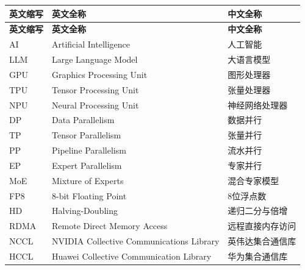 \cleardoublepage
{}
\begin{center}
    \begin{longtable}{m{2cm}m{8cm}m{5cm}}
        \toprule
        \textbf{英文缩写}&\textbf{英文全称}&\textbf{中文全称}\\
        \midrule
        \endfirsthead
        \toprule
        \textbf{英文缩写}&\textbf{英文全称}&\textbf{中文全称}\\
        \midrule
        \endhead 
        \bottomrule
        \endfoot
        \bottomrule
        \endlastfoot
        AI&Artificial Intelligence&人工智能\\
        LLM&Large Language Model&大语言模型\\
        GPU&Graphics Processing Unit&图形处理器\\
        TPU&Tensor Processing Unit&张量处理器\\
        NPU&Neural Processing Unit&神经网络处理器\\
        DP&Data Parallelism&数据并行\\
        TP&Tensor Parallelism&张量并行\\
        PP&Pipeline Parallelism&流水并行\\
        EP&Expert Parallelism&专家并行\\
        MoE&Mixture of Experts&混合专家模型\\
        FP8&8-bit Floating Point&8位浮点数\\
        HD&Halving-Doubling&递归二分与倍增\\
        RDMA&Remote Direct Memory Access&远程直接内存访问\\
        NCCL&NVIDIA Collective Communications Library&英伟达集合通信库\\
        HCCL&Huawei Collective Communication Library&华为集合通信库\\

\end{longtable}
\end{center}
